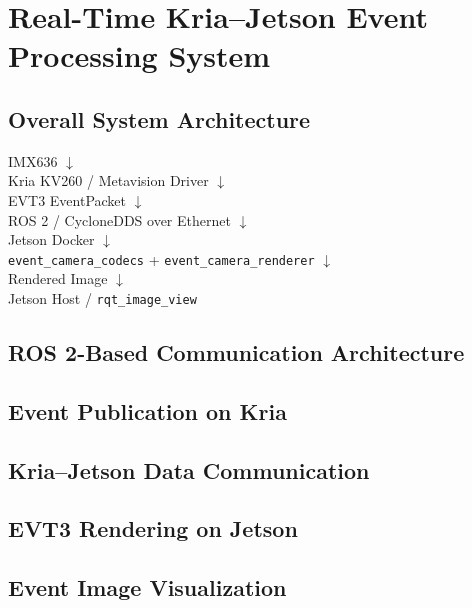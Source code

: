 \section{Real-Time Kria--Jetson Event Processing System}
\subsection{Overall System Architecture}

\begin{center}
IMX636
$\downarrow$\\
Kria KV260 / Metavision Driver
$\downarrow$\\
EVT3 EventPacket
$\downarrow$\\
ROS 2 / CycloneDDS over Ethernet
$\downarrow$\\
Jetson Docker
$\downarrow$\\
\texttt{event\_camera\_codecs} + \texttt{event\_camera\_renderer}
$\downarrow$\\
Rendered Image
$\downarrow$\\
Jetson Host / \texttt{rqt\_image\_view}
\end{center}

\subsection{ROS 2-Based Communication Architecture}
\subsection{Event Publication on Kria}
\subsection{Kria--Jetson Data Communication}
\subsection{EVT3 Rendering on Jetson}
\subsection{Event Image Visualization}
